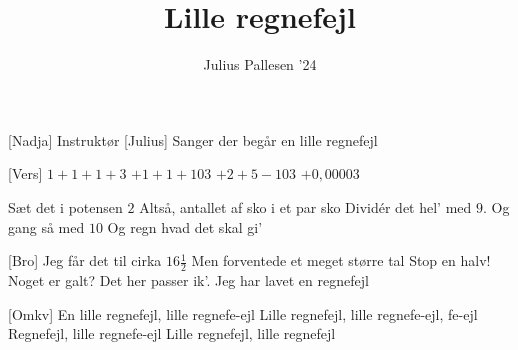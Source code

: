 \documentclass[a4paper,11pt]{article}
\title{Lille regnefejl}
\author{Julius Pallesen '24}
\begin{document}
\maketitle

\begin{roles}
[Nadja] Instruktør
[Julius] Sanger der begår en lille regnefejl
\end{roles}

\begin{song}
    [Vers] $1+1+1+3$
    $+1+1+103$
    $+2+5-103$
    $+0,00003$
    
    Sæt det i potensen $2$
    Altså, antallet af sko i et par sko
    Dividér det hel' med $9$. Og gang så med $10$
    Og regn hvad det skal gi'
    
    [Bro] Jeg får det til cirka $16\frac12$
    Men forventede et meget større tal
    Stop en halv!
    Noget er galt?
    Det her passer ik'. Jeg har lavet en regnefejl

    [Omkv] En lille regnefejl, lille regnefe-ejl
    Lille regnefejl, lille regnefe-ejl, fe-ejl
    Regnefejl, lille regnefe-ejl
    Lille regnefejl, lille regnefejl
\end{song}
\end{document}
